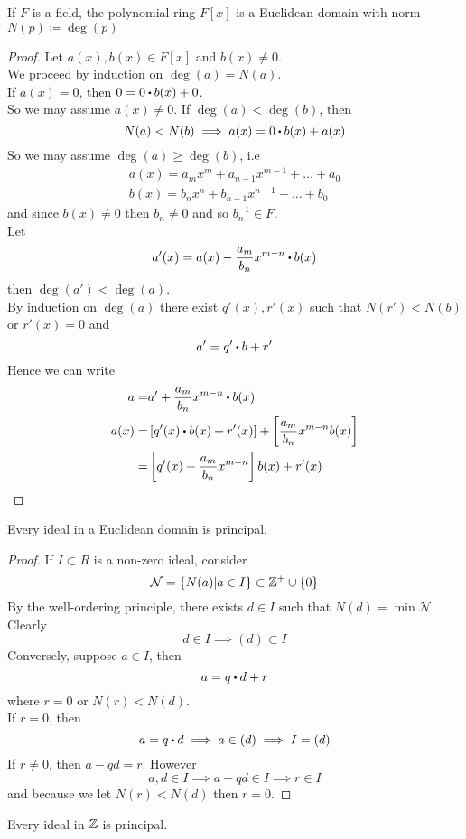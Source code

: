 \documentclass[../Main.tex]{subfiles}
\begin{document}
\begin{example}
	If $F$ is a field, the polynomial ring $F[x]$ is a Euclidean domain with norm $N(p)\coloneqq \deg(p)$
\end{example}
\begin{proof}
	Let $a(x),b(x)\in F[x]$ and $b(x)\ne 0$.\\
	We proceed by induction on $\deg(a)=N(a)$.\\
	If $a(x)=0$, then $0=0\rdot b(x)+0$.\\
	So we may assume $a(x)\ne 0$. If $\deg(a)<\deg(b)$, then 
	\[N(a)<N(b)\implies a(x)=0\rdot b(x)+a(x)\]
	So we may assume $\deg(a)\ge \deg(b)$, i.e
	\begin{align*}
	a(x)=a_mx^m+a_{n-1}x^{m-1}+\dots+a_0\\
	b(x)=b_nx^n+b_{n-1}x^{n-1}+\dots+b_0
	\end{align*}
	and since $b(x)\ne 0$ then $b_n\ne 0$ and so $b_n^{-1} \in F$.\\
	Let 
	\[a'(x)=a(x)-\frac{a_m}{b_n}x^{m-n}\rdot b(x)\]
	then $\deg(a')<\deg(a)$.\\
	By induction on $\deg(a)$ there exist $q'(x), r'(x)$ such that $N(r')<N(b)$ or $r'(x)=0$ and
	\[a'=q'\rdot b+r'\]
	Hence we can write
	\begin{align*}
	a=&a'+\frac{a_m}{b_n}x^{m-n}\rdot b(x) \\
	a(x) =& \left[q'(x)\rdot b(x)+r'(x)\right]+\left[\frac{a_m}{b_n}x^{m-n}b(x)\right]\\
	=&\left[q'(x)+\frac{a_m}{b_n}x^{m-n}\right]b(x)+r'(x)
	\end{align*}
\end{proof}
\begin{prop}
	Every ideal in a Euclidean domain is principal.
\end{prop}
\begin{proof}
	If $I\subset R$ is a non-zero ideal, consider
	\[\mathcal{N} = \{N(a)|a\in I\} \subset \mathbb{Z}^+\cup \{0\}\]
	By the well-ordering principle, there exists $d\in I$ such that $N(d)=\min \mathcal{N}$. Clearly
	\[d\in I \implies (d)\subset I\]
	Conversely, suppose $a\in I$, then
	\[a=q\rdot d+r\]
	where $r=0$ or $N(r)<N(d)$.\\
	If $r=0$, then 
	\[a=q\rdot d \implies a\in (d)\implies I=(d)\]
	If $r\ne 0$, then $a-qd=r$. However
	\[a,d\in I\implies a-qd\in I \implies r\in I\]
	and because we let $N(r)<N(d)$ then $r=0$.
\end{proof}
\begin{crl}[title= Ideals in $\Z$ are principal]
	Every ideal in $\Z$ is principal.
\end{crl}
\end{document}
